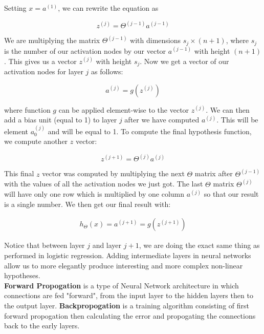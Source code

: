 \documentclass{article}
\begin{document}
        \noindent Setting $x=a^{(1)}$, we can rewrite the equation as

        \begin{equation*}
            z^{(j)} = \Theta^{(j-1)} a^{(j-1)}
        \end{equation*}

        \noindent We are multiplying the matrix $\Theta^{(j-1)}$ with dimensions $s_j\times (n+1)$, where $s_j$
        is the number of our activation nodes by our vector $a^{(j-1)}$ with height $(n+1)$. This gives us a
        vector $z^{(j)}$ with height $s_j$. Now we get a vector of our activation nodes for layer $j$ as
        follows:

        \begin{equation*}
            a^{(j)} = g\left(z^{(j)}\right)
        \end{equation*}

        \noindent where function $g$ can be applied element-wise to the vector $z^{(j)}$. We can then add a
        bias unit (equal to 1) to layer $j$ after we have computed $a^{(j)}$. This will be element $a_0^{(j)}$
        and will be equal to 1. To compute the final hypothesis function, we compute another $z$ vector:

        \begin{equation*}
            z^{(j+1)} = \Theta^{(j)} a^{(j)}
        \end{equation*}

        \noindent This final $z$ vector was computed by multiplying the next $\Theta$ matrix after
        $\Theta^{(j-1)}$ with the values of all the activation nodes we just got. The last $\Theta$ matrix
        $\Theta^{(j)}$ will have only one row which is multiplied by one column $a^{(j)}$ so that our result
        is a single number. We then get our final result with:

        \begin{align*}
            h_{\Theta}(x) = a^{(j+1)} = g\left(z^{(j+1)}\right)
        \end{align*}

        \noindent Notice that between layer $j$ and layer $j+1$, we are doing the exact same thing as performed
        in logistic regression. Adding intermediate layers in neural networks allow us to more elegantly produce
        interesting and more complex non-linear hypotheses. \\

        \noindent \textbf{Forward Propogation} is a type of Neural Network architecture in which connections
        are fed "forward", from the input layer to the hidden layers then to the output layer.
        \textbf{Backpropogation} is a training algorithm consisting of first forward propogation then
        calculating the error and propogating the connections back to the early layers. \\
\end{document}

